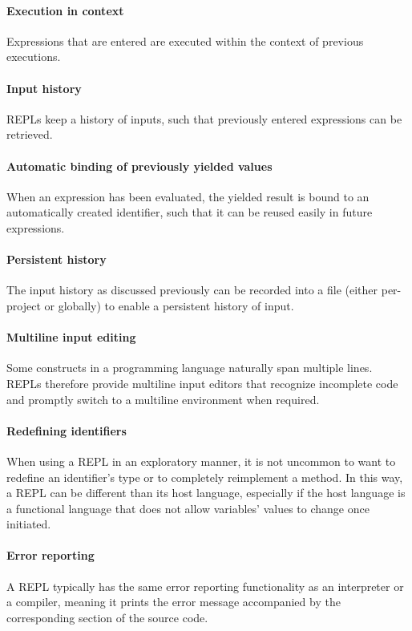\paragraph{Execution in context} Expressions that are entered are executed
within the context of previous executions.

\paragraph{Input history} REPLs keep a history of inputs, such that previously
entered expressions can be retrieved.

\paragraph{Automatic binding of previously yielded values} When an expression
has been evaluated, the yielded result is bound to an automatically created
identifier, such that it can be reused easily in future expressions.

\paragraph{Persistent history} The input history as discussed previously can be
recorded into a file (either per-project or globally) to enable a persistent
history of input.

\paragraph{Multiline input editing} Some constructs in a programming language
naturally span multiple lines. REPLs therefore provide multiline input editors
that recognize incomplete code and promptly switch to a multiline environment
when required.

\paragraph{Redefining identifiers} When using a REPL in an exploratory manner,
it is not uncommon to want to redefine an identifier's type or to completely
reimplement a method. In this way, a REPL can be different than its host
language, especially if the host language is a functional language that does not
allow variables' values to change once initiated.

\paragraph{Error reporting} A REPL typically has the same error reporting
functionality as an interpreter or a compiler, meaning it prints the error
message accompanied by the corresponding section of the source code.

